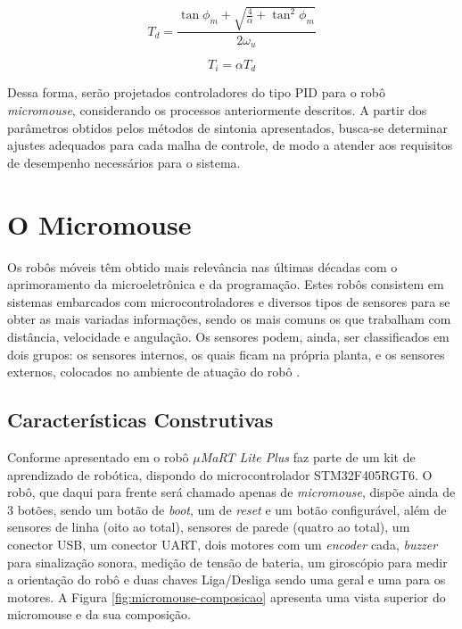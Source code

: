 			\begin{equation}
				\label{eq:parametro-td}
					T_d = \frac{\tan \phi_m + \sqrt{\frac{4}{\alpha} + \tan^2 \phi_m}}{2 \omega_u}
			\end{equation}

			\begin{equation}
				\label{eq:parametro-ti}
				T_i = \alpha T_d
			\end{equation}

			Dessa forma, serão projetados controladores do tipo \gls{PID} para o robô \textit{micromouse}, considerando os processos anteriormente descritos. A partir dos parâmetros obtidos pelos métodos de sintonia apresentados, busca-se determinar ajustes adequados para cada malha de controle, de modo a atender aos requisitos de desempenho necessários para o sistema.


\chapter{O Micromouse}
\label{cap:micromouse}

Os robôs móveis têm obtido mais relevância nas últimas décadas com o aprimoramento da microeletrônica e da programação. Estes robôs consistem em sistemas embarcados com microcontroladores e diversos tipos de sensores para se obter as mais variadas informações, sendo os mais comuns os que trabalham com distância, velocidade e angulação. Os sensores podem, ainda, ser classificados em dois grupos: os sensores internos, os quais ficam na própria planta, e os sensores externos, colocados no ambiente de atuação do robô \cite{dissetacao-pereira-2000}.


    \section{Características Construtivas} \label{sec:caracteristicas-construtivas}
		Conforme apresentado em  o robô \textit{$\mu$MaRT Lite Plus} faz parte de um kit de aprendizado de robótica, dispondo do microcontrolador STM32F405RGT6. O robô, que daqui para frente será chamado apenas de \textit{micromouse}, dispõe ainda de 3 botões, sendo um botão de \textit{boot}, um de \textit{reset} e um botão configurável, além de sensores de linha (oito ao total), sensores de parede (quatro ao total), um conector \gls{USB}, um conector \gls{UART}, dois motores com um \textit{encoder} cada, \textit{buzzer} para sinalização sonora, medição de tensão de bateria, um giroscópio para medir a orientação do robô e duas chaves Liga/Desliga sendo uma geral e uma para os motores. A Figura \ref{fig:micromouse-composicao} apresenta uma vista superior do micromouse e da sua composição.
        
